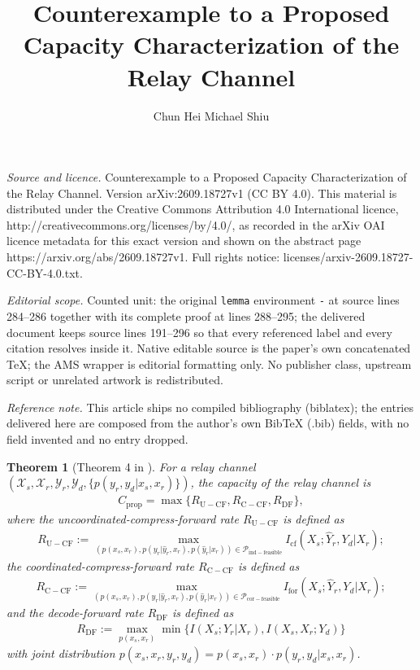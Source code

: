 \documentclass[10pt,a4paper]{amsart}
\newtheorem{theorem}{Theorem}
\begin{document}
\title[Counterexample to a Proposed Capacity Characterization of th]{Counterexample to a Proposed Capacity Characterization of the Relay Channel}
\author{Chun Hei Michael Shiu}
\date{}
\maketitle
\noindent\emph{Source and licence.} Counterexample to a Proposed Capacity Characterization of the Relay Channel. Version arXiv:2609.18727v1 (CC BY 4.0). This material is distributed under the Creative Commons Attribution 4.0 International licence, http://creativecommons.org/licenses/by/4.0/, as recorded in the arXiv OAI licence metadata for this exact version and shown on the abstract page https://arxiv.org/abs/2609.18727v1. Full rights notice: licenses/arxiv-2609.18727-CC-BY-4.0.txt.\par\smallskip
\noindent\textit{Editorial scope.} Counted unit: the original \texttt{lemma} environment \texttt{-} at source lines 284--286 together with its complete proof at lines 288--295; the delivered document keeps source lines 191--296 so that every referenced label and every citation resolves inside it. Native editable source is the paper's own concatenated TeX; the AMS wrapper is editorial formatting only. No publisher class, upstream script or unrelated artwork is redistributed.
\par\smallskip\noindent\textit{Reference note.} This article ships no compiled bibliography (biblatex); the entries delivered here are composed from the author's own BibTeX (.bib) fields, with no field invented and no entry dropped.
\begin{theorem}[Theorem 4 in \cite{pon26}] \label{thm: main thm}
    For a relay channel $(\mathcal X_s,\mathcal X_r, \mathcal Y_r, \mathcal Y_d, \{p(y_r, y_d | x_s, x_r)\})$, the capacity of the relay channel is 
    \begin{align*}
        C_{\mathrm{prop}} = \max\{R_{\mathrm{U-CF}}, R_{\mathrm{C-CF}}, R_{\mathrm{DF}}\},
    \end{align*}
    where the uncoordinated-compress-forward rate $R_{\mathrm{U-CF}}$ is defined as
    \begin{align*}
        R_{\mathrm{U-CF}} := \max_{(p(x_s, x_r), p(y_r |\hat{y}_r, x_r), p(\hat{y}_r|x_r)) \in \mathcal P_{\mathrm{ind-feasible}}} I_{\mathrm{cf}}(X_s; \hat{Y}_r, Y_d | X_r);
    \end{align*}
    the coordinated-compress-forward rate $R_{\mathrm{C-CF}}$ is defined as 
    \begin{align*}
        R_{\mathrm{C-CF}} := \max_{(p(x_s, x_r), p(y_r |\hat{y}_r, x_r), p(\hat{y}_r|x_r)) \in \mathcal P_{\mathrm{cor-feasible}}} I_{\mathrm{for}}(X_s; \hat{Y}_r, Y_d | X_r);
    \end{align*}
    and the decode-forward rate $R_{\mathrm{DF}}$ is defined as 
    \begin{align*}
        R_{\mathrm{DF}} := \max_{p(x_s, x_r)} \min\{I(X_s; Y_r | X_r), I(X_s, X_r; Y_d)\}
    \end{align*}
    with joint distribution $p(x_s, x_r, y_r, y_d) = p(x_s, x_r) \cdot p(y_r, y_d | x_s, x_r)$.
\end{theorem}
\end{document}
